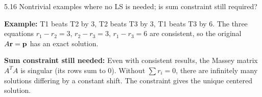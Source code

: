 \begin{exercise}{5.16}
Nontrivial examples where no LS is needed; is sum constraint still required?
\end{exercise}
\begin{solution}
\textbf{Example:} T1 beats T2 by 3, T2 beats T3 by 3, T1 beats T3 by 6. The three equations $r_1-r_2=3$, $r_2-r_3=3$, $r_1-r_3=6$ are consistent, so the original $A\mathbf{r}=\mathbf{p}$ has an exact solution.

\textbf{Sum constraint still needed:} Even with consistent results, the Massey matrix $A^TA$ is singular (its rows sum to 0). Without $\sum r_i=0$, there are infinitely many solutions differing by a constant shift. The constraint gives the unique centered solution.
\end{solution}
